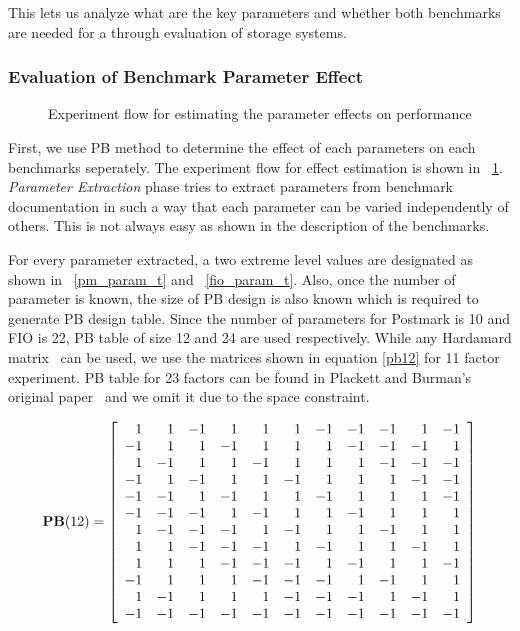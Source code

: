  This lets us analyze what are the key parameters and whether both benchmarks are needed for a through evaluation of storage systems.

\subsubsection{Evaluation of Benchmark Parameter Effect}

\begin{figure}[!t]
\centering

\caption{Experiment flow for estimating the parameter effects on performance}
\label{pb_flow_t}
\end{figure}

First, we use PB method to determine the effect of each parameters on each benchmarks seperately. 
The experiment flow for effect estimation is shown in \figurename~\ref{pb_flow_t}. 
\emph{Parameter Extraction} phase tries to extract parameters from benchmark documentation in such a way that each parameter can be varied independently of others. 
This is not always easy as shown in the description of the benchmarks. 

For every parameter extracted, a two extreme level values are designated as shown in \tablename~\ref{pm_param_t} and \tablename~\ref{fio_param_t}. 
Also, once the number of parameter is known, the size of PB design is also known which is required to generate PB design table.  
Since the number of parameters for Postmark is 10 and FIO is 22, PB table of size 12 and 24 are used respectively. 
While any Hardamard matrix~\cite{hadamar:1954} can be used, we use the matrices shown in equation \ref {pb12} for 11 factor experiment.  
PB table for 23 factors can be found in Plackett and Burman's original paper~\cite{plackett:1946} and we omit it due to the space constraint. 

\begin{equation}\label{pb12}
\mathbf{PB}(12)=
\left [ {\begin{array}{r r r r r r r r r r r}
  1&  1& -1&  1&  1&  1& -1& -1& -1&  1& -1\\
 -1&  1&  1& -1&  1&  1&  1& -1& -1& -1&  1\\
  1& -1&  1&  1& -1&  1&  1&  1& -1& -1& -1\\
 -1&  1& -1&  1&  1& -1&  1&  1&  1& -1& -1\\
 -1& -1&  1& -1&  1&  1& -1&  1&  1&  1& -1\\
 -1& -1& -1&  1& -1&  1&  1& -1&  1&  1&  1\\
  1& -1& -1& -1&  1& -1&  1&  1& -1&  1&  1\\
  1&  1& -1& -1& -1&  1& -1&  1&  1& -1&  1\\
  1&  1&  1& -1& -1& -1&  1& -1&  1&  1& -1\\
 -1&  1&  1&  1& -1& -1& -1&  1& -1&  1&  1\\
  1& -1&  1&  1&  1& -1& -1& -1&  1& -1&  1\\
 -1& -1& -1& -1& -1& -1& -1& -1& -1& -1& -1\\
\end{array}} \right ] 
\end{equation}

